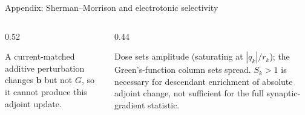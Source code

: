 \begin{frame}{Appendix: Sherman--Morrison and electrotonic selectivity}
  \begin{columns}[T,onlytextwidth]
    \begin{column}{0.52\textwidth}
      {\footnotesize A current-matched additive perturbation changes $\bm b$
       but not $G$, so it cannot produce this adjoint update.\par}
    \end{column}
    \begin{column}{0.44\textwidth}
      {\footnotesize Dose sets amplitude (saturating at $|q_k|/r_k$); the
       Green's-function column sets spread. $S_k>1$ is necessary for
       descendant enrichment of absolute adjoint change, not sufficient for
       the full synaptic-gradient statistic.\par}
    \end{column}
  \end{columns}
  \vfill
  \vspace{0.04cm}
\end{frame}


